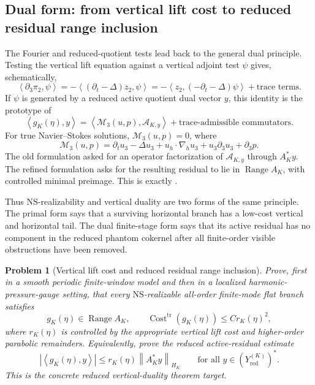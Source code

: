 \documentclass[11pt]{article}
\numberwithin{equation}{section}
\newtheorem{problem}[theorem]{Problem}
\DeclareMathOperator{\Range}{Range}
\DeclareMathOperator{\Cost}{Cost}
\newcommand{\trc}{\mathrm{tr}}
\newcommand{\NS}{\mathrm{NS}}
\newcommand{\nabh}{\nabla_h}
\newcommand{\norm}[2]{\left\|#1\right\|_{#2}}
\newcommand{\ip}[2]{\left\langle #1,#2\right\rangle}
\newcommand{\calA}{\mathcal A}
\newcommand{\calM}{\mathcal M}
\begin{document}
\subsection{Dual form: from vertical lift cost to reduced residual range inclusion}\label{subsec:VCost-to-VD}

The Fourier and reduced-quotient tests lead back to the general dual principle.  Testing the vertical lift equation against a vertical adjoint test \(\psi\) gives, schematically,
\[
\ip{\partial_3\pi_2}{\psi}
=-\ip{(\partial_t-\Delta)z_2}{\psi}
=-\ip{z_2}{(-\partial_t-\Delta)\psi}+\text{trace terms}.
\]
If \(\psi\) is generated by a reduced active quotient dual vector \(y\), this identity is the prototype of
\begin{equation}\label{eq:VD-from-adjoint-new}
\ip{g_K(\eta)}{y}
=
\ip{\calM_3(u,p)}{\calA_{K,y}}
+\text{trace-admissible commutators}.
\end{equation}
For true Navier--Stokes solutions, \(\calM_3(u,p)=0\), where
\[
\calM_3(u,p)=
\partial_tu_3-\Delta u_3+u_h\cdot\nabh u_3+u_3\partial_3u_3+
\partial_3p.
\]
The old formulation asked for an operator factorization of \(\calA_{K,y}\) through \(A_K^*y\).  The refined formulation asks for the resulting residual to lie in \(\Range A_K\), with controlled minimal preimage.  This is exactly .

Thus \(\NS\)-realizability and vertical duality are two forms of the same principle.  The primal form says that a surviving horizontal branch has a low-cost vertical and horizontal tail.  The dual finite-stage form says that its active residual has no component in the reduced phantom cokernel after all finite-order visible obstructions have been removed.

\begin{problem}[Vertical lift cost and reduced residual range inclusion]\label{prob:vertical-lift-factorization}
Prove, first in a smooth periodic finite-window model and then in a localized harmonic-pressure-gauge setting, that every \(\NS\)-realizable all-order finite-mode flat branch satisfies
\[
g_K(\eta)\in\Range A_K,
\qquad
\Cost^{\trc}(g_K(\eta))\le C r_K(\eta)^2,
\]
where \(r_K(\eta)\) is controlled by the appropriate vertical lift cost and higher-order parabolic remainders.  Equivalently, prove the reduced active-residual estimate
\[
|\ip{g_K(\eta)}{y}|
\le r_K(\eta)\norm{A_K^*y}{H_K}
\qquad
\text{for all }y\in (Y_{\mathrm{red}}^{(K)})^*.
\]
This is the concrete reduced vertical-duality theorem target.
\end{problem}
\end{document}
